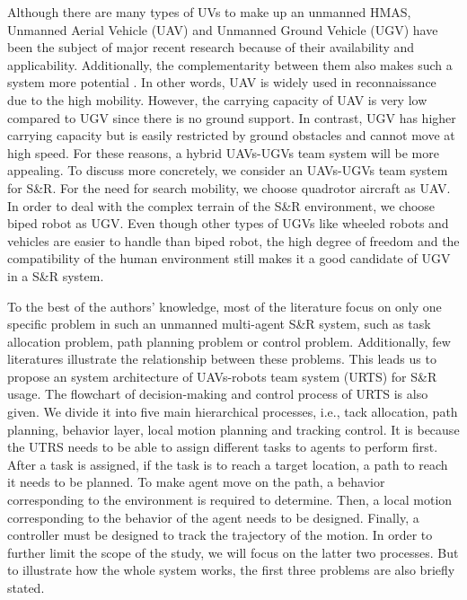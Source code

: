 \documentclass{ieeeaccess}
\begin{document}
Although there are many types of UVs to make up an unmanned HMAS, Unmanned Aerial Vehicle (UAV) and Unmanned Ground Vehicle (UGV) have been the subject of major recent research because of their availability and applicability. Additionally, the complementarity between them also makes such a system more potential \cite{arbanas2018decentralized}. In other words, UAV is widely used in reconnaissance due to the high mobility. However, the carrying capacity of UAV is very low compared to UGV since there is no ground support. In contrast, UGV has higher carrying capacity but is easily restricted by ground obstacles and cannot move at high speed. For these reasons, a hybrid UAVs-UGVs team system will be more appealing. To discuss more concretely, we consider an UAVs-UGVs team system for S\&R. For the need for search mobility, we choose quadrotor aircraft as UAV. In order to deal with the complex terrain of the S\&R environment, we choose biped robot as UGV. Even though other types of UGVs like wheeled robots and vehicles are easier to handle than biped robot, the high degree of freedom and the compatibility of the human environment still makes it a good candidate of UGV in a S\&R system.

To the best of the authors' knowledge, most of the literature focus on only one specific problem in such an unmanned multi-agent S\&R system, such as task allocation problem, path planning problem or control problem. Additionally, few literatures illustrate the relationship between these problems. This leads us to propose an system architecture of UAVs-robots team system (URTS) for S\&R usage. The flowchart of decision-making and control process of URTS is also given. We divide it into five main hierarchical processes, i.e., tack allocation, path planning, behavior layer, local motion planning and tracking control. It is because the UTRS needs to be able to assign different tasks to agents to perform first. After a task is assigned, if the task is to reach a target location, a path to reach it needs to be planned. To make agent move on the path, a behavior corresponding to the environment is required to determine. Then, a local motion corresponding to the behavior of the agent needs to be designed. Finally, a controller must be designed to track the trajectory of the motion. In order to further limit the scope of the study, we will focus on the latter two processes. But to illustrate how the whole system works, the first three problems are also briefly stated.
\end{document}
